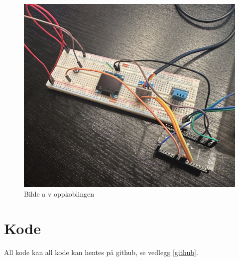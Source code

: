 \documentclass{article}
\begin{document}
\begin{figure}[h!]
    \centering
    \includegraphics[width=0.8\linewidth]{Oppkobling.JPEG}
    \caption{Bilde a v oppkoblingen}
    \label{fig:oppkobling}
\end{figure}
\newpage
\section{Kode}
\label{Kode}
All kode kan all kode kan hentes på github, se vedlegg \ref{github}.
\end{document}
